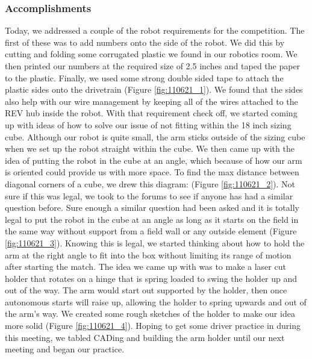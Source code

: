 \subsubsection*{Accomplishments}
Today, we addressed a couple of the robot requirements for the competition. The first of these was to add numbers onto the side of the robot. We did this by cutting and folding some corrugated plastic we found in our robotics room. We then printed our numbers at the required size of 2.5 inches and taped the paper to the plastic. Finally, we used some strong double sided tape to attach the plastic sides onto the drivetrain (Figure \ref{fig:110621_1}). We found that the sides also help with our wire management by keeping all of the wires attached to the REV hub inside the robot.
With that requirement check off, we started coming up with ideas of how to solve our issue of not fitting within the 18 inch sizing cube. Although our robot is quite small, the arm sticks outside of the sizing cube when we set up the robot straight within the cube. We then came up with the idea of putting the robot in the cube at an angle, which because of how our arm is oriented could provide us with more space. To find the max distance between diagonal corners of a cube, we drew this diagram: (Figure \ref{fig:110621_2}). Not sure if this was legal, we took to the forums to see if anyone has had a similar question before. Sure enough a similar question had been asked and it is totally legal to put the robot in the cube at an angle as long as it starts on the field in the same way without support from a field wall or any outside element (Figure \ref{fig:110621_3}). Knowing this is legal, we started thinking about how to hold the arm at the right angle to fit into the box without limiting its range of motion after starting the match. The idea we came up with was to make a laser cut holder that rotates on a hinge that is spring loaded to swing the holder up and out of the way. The arm would start out supported by the holder, then once autonomous starts will raise up, allowing the holder to spring upwards and out of the arm’s way. We created some rough sketches of the holder to make our idea more solid (Figure \ref{fig:110621_4}). Hoping to get some driver practice in during this meeting, we tabled CADing and building the arm holder until our next meeting and began our practice.

 

